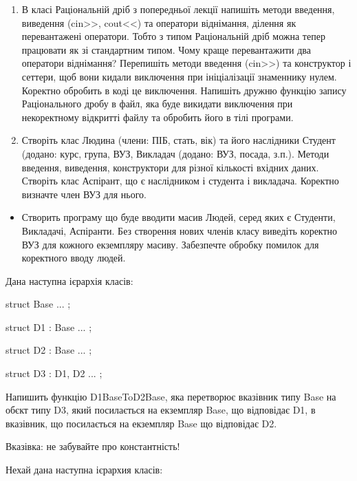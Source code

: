 \documentclass[]{article}
\begin{document}
\begin{enumerate}
\def\labelenumi{\arabic{enumi}.}
\item
  В класі Раціональній дріб з попередньої лекції напишіть методи
  введення, виведення (cin\textgreater{}\textgreater{},
  cout\textless{}\textless{}) та оператори віднімання, ділення як
  перевантажені оператори. Тобто з типом Раціональній дріб можна тепер
  працювати як зі стандартним типом. Чому краще перевантажити два
  оператори віднімання? Перепишіть методи введення
  (cin\textgreater{}\textgreater{}) та конструктор і сеттери, щоб вони
  кидали виключення при ініціалізації знаменнику нулем. Коректно
  обробить в коді це виключення. Напишіть дружню функцію запису
  Раціонального дробу в файл, яка буде викидати виключення при
  некоректному відкритті файлу та обробить його в тілі програми.
\item
  Створіть клас Людина (члени: ПІБ, стать, вік) та його наслідники
  Студент (додано: курс, група, ВУЗ, Викладач (додано: ВУЗ, посада,
  з.п.). Методи введення, виведення, конструктори для різної кількості
  вхідних даних. Створіть клас Аспірант, що є наслідником і студента і
  викладача. Коректно визначте член ВУЗ для нього.
\end{enumerate}

\begin{itemize}
\item
  Створить програму що буде вводити масив Людей, серед яких є Студенти,
  Викладачі, Аспіранти. Без створення нових членів класу виведіть
  коректно ВУЗ для кожного екземпляру масиву. Забезпечте обробку помилок
  для коректного вводу людей.
\end{itemize}





Дана наступна ієрархія класів:

struct Base { ... }; 

struct D1 : Base { ... };

struct D2 : Base { ... }; 

struct D3 : D1, D2 { ... };

Напишить функцію D1BaseToD2Base, яка перетворює вказівник типу Base на обєкт типу D3, 
який посилається на екземпляр Base, що відповідає D1, в вказівник, що посилається на екземпляр Base що відповідає D2.

Вказівка: не забувайте про константність!




Нехай дана наступна ієрархия класів:
\end{document}
